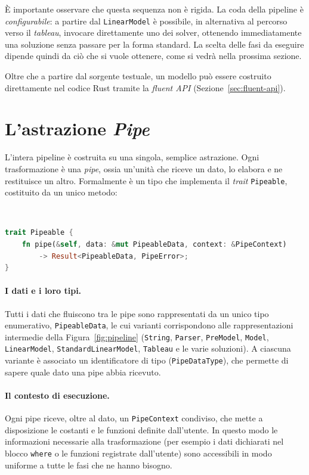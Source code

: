 È importante osservare che questa sequenza non è rigida. La coda della pipeline
è \emph{configurabile}: a partire dal \texttt{LinearModel} è possibile, in
alternativa al percorso verso il \emph{tableau}, invocare direttamente uno dei
solver, ottenendo immediatamente una soluzione senza passare per la forma
standard. La scelta delle fasi da eseguire dipende quindi da ciò che si vuole
ottenere, come si vedrà nella prossima sezione.

Oltre che a partire dal sorgente testuale, un modello può essere
costruito direttamente nel codice Rust tramite la
\emph{fluent API} (Sezione~\ref{sec:fluent-api}).

\section{L'astrazione \emph{Pipe}}
\label{sec:pipe}

L'intera pipeline è costruita su una singola, semplice astrazione. Ogni
trasformazione è una \emph{pipe}, ossia un'unità che riceve un dato, lo elabora
e ne restituisce un altro. Formalmente è un tipo che implementa il \emph{trait}
\texttt{Pipeable}, costituito da un unico metodo:

\

\begin{lstlisting}[language=rust, caption={Il trait \texttt{Pipeable}.}, label={lst:pipeable}]
trait Pipeable {
    fn pipe(&self, data: &mut PipeableData, context: &PipeContext)
        -> Result<PipeableData, PipeError>;
}
\end{lstlisting}

\paragraph{I dati e i loro tipi.}
Tutti i dati che fluiscono tra le pipe sono rappresentati da un unico tipo
enumerativo, \texttt{PipeableData}, le cui varianti corrispondono alle rappresentazioni
intermedie della Figura~\ref{fig:pipeline} (\texttt{String}, \texttt{Parser},
\texttt{PreModel}, \texttt{Model}, \texttt{LinearModel},
\texttt{StandardLinearModel}, \texttt{Tableau} e le varie soluzioni). A ciascuna
variante è associato un identificatore di tipo (\texttt{PipeDataType}), che
permette di sapere quale dato una pipe abbia ricevuto.

\paragraph{Il contesto di esecuzione.}
Ogni pipe riceve, oltre al dato, un \texttt{PipeContext} condiviso, che mette a
disposizione le costanti e le funzioni definite dall'utente. In questo modo le
informazioni necessarie alla trasformazione (per esempio i dati dichiarati nel
blocco \texttt{where} o le funzioni registrate dall'utente) sono accessibili in
modo uniforme a tutte le fasi che ne hanno bisogno.

